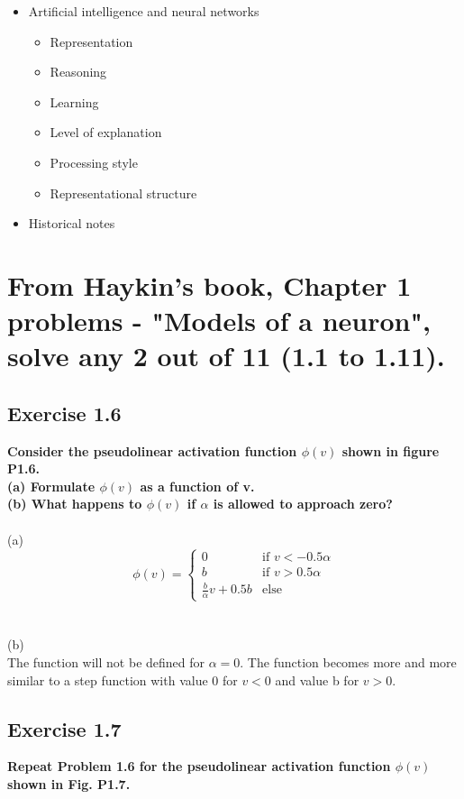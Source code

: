 \documentclass[paper=a4, fontsize=11pt]{scrartcl} %
\numberwithin{equation}{section} %
\numberwithin{figure}{section} %
\numberwithin{table}{section} %
\begin{document}
\begin{itemize}
\item Artificial intelligence and neural networks
\begin{itemize}
	\item Representation
	\item Reasoning
	\item Learning
	\item Level of explanation
	\item Processing style
	\item Representational structure
\end{itemize}

\item Historical notes

\end{itemize}


\section{From Haykin's book, Chapter 1 problems - "Models of a neuron", solve any 2 out of 11
(1.1 to 1.11).}

\subsection{Exercise 1.6}
\textbf{Consider the pseudolinear activation function $\phi(v)$ shown in figure P1.6.\\
(a) Formulate $\phi(v)$ as a function of v.\\
(b) What happens to $\phi(v)$ if $\alpha$ is allowed to approach zero?}\\\\
 
(a)\\
\[ \phi(v) =
\left\{
	\begin{array}{ll}
		0  & \mbox{if } v < -0.5\alpha \\
		b & \mbox{if } v > 0.5\alpha \\
		\frac{b}{\alpha}v + 0.5b & \mbox{else}
	\end{array}
\right.\]\\\\

(b)\\
The function will not be defined for $\alpha =0$. The function becomes more and more similar to a step function with value 0 for $v<0$ and value b for $v>0$.

\subsection{Exercise 1.7}
\textbf{Repeat Problem 1.6 for the pseudolinear activation function $\phi(v)$ shown in Fig. P1.7.}\\\\
\end{document}
